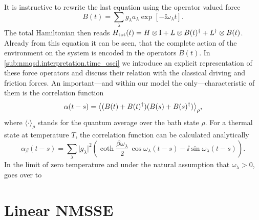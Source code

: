 It is instructive to rewrite the last equation using the operator valued force
\begin{equation}
  B(t)=\sum_\lambda g_\lambda a_\lambda \exp[-\ii\omega_\lambda t].
  \label{eq:nmqsd.force_operator}
\end{equation}
The total Hamiltonian then reads $H_\mathrm{tot}(t) = H \otimes \mathrm{I}  +  L \otimes B(t)^\dagger  +  L^\dagger \otimes B(t)$.
Already from this equation it can be seen, that the complete action of the environment on the system is encoded in the operators $B(t)$.
In \autoref{sub:nmqsd.interpretation.time_osci} we introduce an explicit representation of these force operators and discuss their relation with the classical driving and friction forces.
An important---and within our model the only---characteristic of them is the correlation function
\begin{equation*}
  \alpha(t-s) = \big\langle  (B(t) + B(t)^\dagger)(B(s) + B(s)^\dagger) \big\rangle_\rho,
\end{equation*}
where $\langle\cdot\rangle_\rho$ stands for the quantum average over the bath state $\rho$.
For a thermal state at temperature $T$, the correlation function can be calculated analytically \cite{FeHi10_path_integrals}
\begin{equation}
  \alpha_\beta(t - s) = \sum_\lambda  \vert g_\lambda \vert^2  \left( \operatorname{coth} \frac{\beta\omega_\lambda}{2} \, \cos \omega_\lambda (t-s)  -  \ii \sin \omega_\lambda(t-s) \right).
  \label{eq:nmqsd.thermal_correlation_function}
\end{equation}
In the limit of zero temperature and under the natural assumption that $\omega_\lambda > 0$,  goes over to

\section{Linear NMSSE}
\label{sec:nmqsd.lin_nmsse}
%
%

